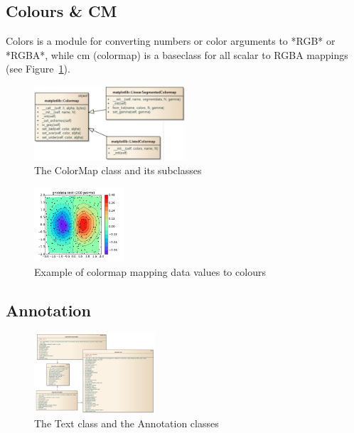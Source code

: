 \documentclass[pdftex,10pt,a4paper]{report}
\begin{document}
\subsection{Colours \& CM}
Colors is a module for converting numbers or color arguments to *RGB* or *RGBA*, while cm (colormap) is a baseclass for all scalar to RGBA mappings (see Figure~\ref{fig:cm}).

\begin{figure}[ht!]
        \centering
                \includegraphics[width=0.5\textwidth]{img/umls/kevin/cm}
        \caption{The ColorMap class and its subclasses}\label{fig:cm}
\end{figure}

\begin{figure}[ht!]
        \centering
                \includegraphics[width=0.3\textwidth]{img/umls/kevin/griddata}
        \caption{Example of colormap mapping data values to colours}\label{fig:artistExAgg}
\end{figure}

\subsection{Annotation}

\begin{figure}[ht!]
        \centering
                \includegraphics[width=0.4\textwidth]{img/umls/derek/annotation}
        \caption{The Text class and the Annotation classes}\label{fig:artistExAgg}
\end{figure}
\end{document}
